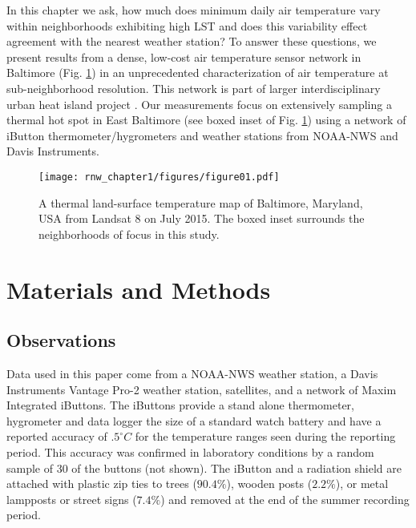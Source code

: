 In this chapter we ask, how much does minimum daily air temperature vary within neighborhoods exhibiting high LST and does this variability effect agreement with the nearest weather station? 
To answer these questions, we present results from a dense, low-cost air temperature sensor network in Baltimore (Fig. \ref{heatmap}) in an unprecedented characterization of air temperature at sub-neighborhood resolution. This network is part of larger interdisciplinary urban heat island project  \citep{earthzinearticle}. Our measurements focus on extensively sampling a thermal hot spot in East Baltimore (see boxed inset of Fig. \ref{heatmap}) using a network of iButton thermometer/hygrometers and weather stations from NOAA-NWS and Davis Instruments. 

\begin{figure}
\noindent\texttt{[image: rnw\_chapter1/figures/figure01.pdf]}
\caption{A thermal land-surface temperature map of Baltimore, Maryland, USA from Landsat 8 \citep{landsat8} on July 2015. The boxed inset surrounds the neighborhoods of focus in this study.}
\label{heatmap}
\end{figure}

\section{Materials and Methods}

\subsection{Observations}
Data used in this paper come from a NOAA-NWS weather station, a Davis Instruments Vantage Pro-2 weather station, satellites, and a network of Maxim Integrated iButtons. The iButtons provide a stand alone thermometer, hygrometer and data logger the size of a standard watch battery and have a reported accuracy of $ .5^{\circ} C $ for the temperature ranges seen during the reporting period. This accuracy was confirmed in laboratory conditions by a random sample of 30 of the buttons (not shown). 
The iButton and a radiation shield are attached with plastic zip ties to trees ($90.4\%$), wooden posts  ($2.2\%$), or metal lampposts or street signs ($7.4\%$) and removed at the end of the summer recording period. 

